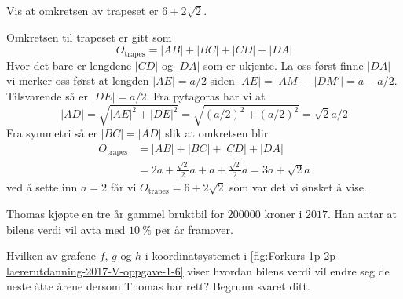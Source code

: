 \begin{oppgaver}
   Vis at omkretsen av trapeset er $6 + 2\sqrt{2}$.
\end{oppgaver}

\begin{losninger}
  Omkretsen til trapeset er gitt som
  \begin{equation}
    O_{\text{trapes}} = |AB| + |BC| + |CD| + |DA|
  \end{equation}
  Hvor det bare er lengdene $|CD|$ og $|DA|$ som er ukjente. La oss først
  finne $|DA|$ vi merker oss først at lengden $|AE| = a/2$ siden $|AE| = |AM|
  - |DM'| = a - a/2$.  Tilsvarende så er $|DE| = a/2$. Fra pytagoras har vi at
  \begin{equation}
    |AD|
    = \sqrt{|AE|^2 + |DE|^2}
    = \sqrt{(a/2)^2 + (a/2)^2}
    = \sqrt{2}a/2
  \end{equation}
  Fra symmetri så er $|BC|=|AD|$ slik at omkretsen blir
  \begin{align*}
    O_{\text{trapes}}
        & = |AB| + |BC| + |CD| + |DA| \\
        & =   2a  +   \frac{\sqrt{2}}{2}a + a + \frac{\sqrt{2}}{2}a
        =   3a  + \sqrt{2}a
  \end{align*}
  ved å sette inn $a=2$ får vi $O_{\text{trapes}} = 6 + 2 \sqrt{2}$ som var
  det vi ønsket å vise.
\end{losninger}


\Oppgave[2]

Thomas kjøpte en tre år gammel bruktbil for $\num{200000}$ kroner i $2017$. Han
antar at bilens verdi vil avta med  $\SI{10}{\percent}$ per år framover.

\begin{oppgaver}
   Hvilken av grafene $f$, $g$ og $h$ i koordinatsystemet i
    \cref{fig:Forkurs-1p-2p-laererutdanning-2017-V-oppgave-1-6} viser hvordan
    bilens verdi vil endre seg de neste åtte årene dersom Thomas har rett?
    Begrunn svaret ditt.
\end{oppgaver}

